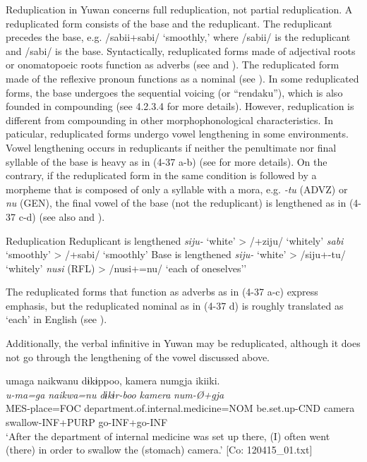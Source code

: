 Reduplication in Yuwan concerns full reduplication, not partial reduplication. A reduplicated form consists of the base and the reduplicant. The reduplicant precedes the base, e.g. /sabii+sabi/ ‘smoothly,’ where /sabii/ is the reduplicant and /sabi/ is the base. Syntactically, reduplicated forms made of adjectival roots or onomatopoeic roots function as adverbs (see  and ). The reduplicated form made of the reflexive pronoun functions as a nominal (see ). In some reduplicated forms, the base undergoes the sequential voicing (or “rendaku”), which is also founded in compounding (see 4.2.3.4 for more details). However, reduplication is different from compounding in other morphophonological characteristics. In paticular, reduplicated forms undergo vowel lengthening in some environments. Vowel lengthening occurs in reduplicants if neither the penultimate nor final syllable of the base is heavy as in (4-37 a-b) (see  for more details). On the contrary, if the reduplicated form in the same condition is followed by a morpheme that is composed of only a syllable with a mora, e.g. \textit{{}-tu} (ADVZ) or \textit{nu} (GEN), the final vowel of the base (not the reduplicant) is lengthened as in (4-37 c-d) (see also  and ). 

\ea  Reduplication \label{ex:4.37}
 Reduplicant is lengthened
  \ea  \textit{siju-}  ‘white’  >  /+ziju/  ‘whitely’
  \ex  \textit{sabi}  ‘smoothly’  >  /+sabi/  ‘smoothly’
 Base is lengthened
  \ex  \textit{siju-}  ‘white’  >  /siju+-tu/  ‘whitely’
  \ex  \textit{nusi}  (RFL)  >  /nusi+=nu/  ‘each of oneselves’’
  \z
\z

The reduplicated forms that function as adverbs as in (4-37 a-c) express emphasis, but the reduplicated nominal as in (4-37 d) is roughly translated as ‘each’ in English (see ).

  Additionally, the verbal infinitive in Yuwan may be reduplicated, although it does not go through the lengthening of the vowel discussed above.

\ea  \label{ex:4.38}
\ea %
\glll    umaga  naikwanu  dɨkɨppoo,   {\textbar}kamera{\textbar}  numgja  ikiiki.\\
      \textit{u-ma=ga}  \textit{naikwa=nu}  \textit{dɨkɨr-boo}    \textit{kamera}  \textit{num-Ø+gja}  \textit{}\\
      MES-place=FOC  department.of.internal.medicine=NOM  be.set.up-CND  camera  swallow-INF+PURP  go-INF+go-INF      \\
      \glt       ‘After the department of internal medicine was set up there, (I) often went (there) in order to swallow the (stomach) camera.’ [Co: 120415\_01.txt]


